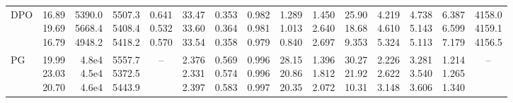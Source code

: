 \begin{landscape}
\begin{table}[t]
{\begin{tabular}{@{}lrrrrrrrrrrrrrr@{}}
DPO & \makecell[r]{16.89\\19.69\\16.79} & \makecell[r]{5390.0\\5668.4\\4948.2} & \makecell[r]{5507.3\\5408.4\\5418.2} & \makecell[r]{0.641\\0.532\\0.570} & \makecell[r]{33.47\\33.60\\33.54} & \makecell[r]{0.353\\0.364\\0.358} & \makecell[r]{0.982\\0.981\\0.979} & \makecell[r]{1.289\\1.013\\0.840} & \makecell[r]{1.450\\2.640\\2.697} & \makecell[r]{25.90\\18.68\\9.353} & \makecell[r]{4.219\\4.610\\5.324} & \makecell[r]{4.738\\5.143\\5.113} & \makecell[r]{6.387\\6.599\\7.179} & \makecell[r]{4158.0\\4159.1\\4156.5} \\
PG & \makecell[r]{19.99\\23.03\\20.70} & \makecell[r]{4.8e4\\4.5e4\\4.6e4} & \makecell[r]{5557.7\\5372.5\\5443.9} & \multicolumn{1}{c}{--} & \makecell[r]{2.376\\2.331\\2.397} & \makecell[r]{0.569\\0.574\\0.583} & \makecell[r]{0.996\\0.996\\0.997} & \makecell[r]{28.15\\20.86\\20.35} & \makecell[r]{1.396\\1.812\\2.072} & \makecell[r]{30.27\\21.92\\10.31} & \makecell[r]{2.226\\2.622\\3.148} & \makecell[r]{3.281\\3.540\\3.606} & \makecell[r]{1.214\\1.265\\1.340} & \multicolumn{1}{c}{--} \\

\end{tabular}}
\end{table}
\end{landscape}
